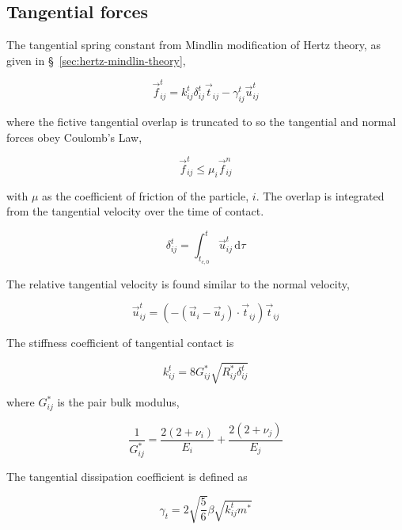 \subsection{Tangential forces}
The tangential spring constant from Mindlin modification of Hertz theory, as given in \S~\ref{sec:hertz-mindlin-theory}, 

\begin{equation}\label{eq:tangential-force}
	\vec{f}^t_{ij} = k^t_{ij} \delta^t_{ij}\vec{t}_{ij} - \gamma^t_{ij} \vec{u}^t_{ij}
\end{equation}

where the fictive tangential overlap is truncated to so the tangential and normal forces obey Coulomb's Law,

\begin{equation}
	\vec{f}^t_{ij} \le \mu_i \vec{f}^n_{ij}
\end{equation}

with $\mu$ as the coefficient of friction of the particle, $i$.  The overlap is integrated from the tangential velocity over the time of contact.

\begin{equation}
	\delta^t_{ij} = \int_{t_{c,0}}^{t} \vec{u}^t_{ij}\,\mathrm{d}\tau
\end{equation}

The relative tangential velocity is found similar to the normal velocity,

\begin{equation}
	\vec{u}^t_{ij} = (-(\vec{u}_i-\vec{u}_j)\cdot\vec{t}_{ij})\vec{t}_{ij}
\end{equation}

The stiffness coefficient of tangential contact is

\begin{equation}
	k^t_{ij} = 8 G_{ij}^*\sqrt{R_{ij}^*\delta^t_{ij}}
\end{equation}

where $G_{ij}^*$ is the pair bulk modulus,

\begin{equation}
	\frac{1}{G^*_{ij}} = \frac{2(2+\nu_i)}{E_i} + \frac{2(2+\nu_j)}{E_j}
\end{equation}

The tangential dissipation coefficient is defined as

\begin{equation}
	\gamma_t = 2\sqrt{\frac{5}{6}}\beta\sqrt{k^t_{ij} m^*}
\end{equation}



